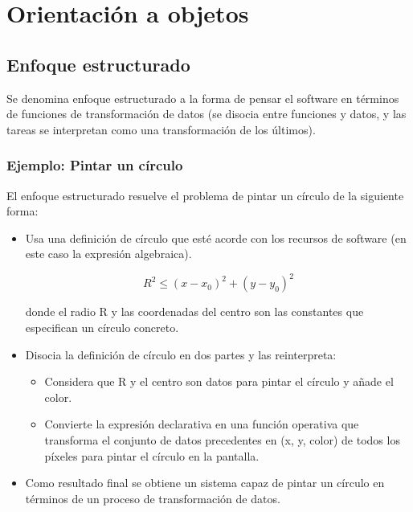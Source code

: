 
\section{Orientación a objetos}
\label{sec:org3620eb4}
\subsection{Enfoque estructurado}
\label{sec:orgc590b61} Se denomina enfoque estructurado a la forma de
pensar el software en términos de funciones de transformación de datos
(se disocia entre funciones y datos, y las tareas se interpretan como
una transformación de los últimos).

\subsubsection{Ejemplo: Pintar un círculo}
\label{sec:orge1ddd3a} El enfoque estructurado resuelve el problema de
pintar un círculo de la siguiente forma:
\begin{itemize}
\item Usa una definición de círculo que esté acorde con los recursos
  de software (en este caso la expresión algebraica).

  \begin{equation} R^{2} \le (x - x_{0})^{2} + (y - y_{0})^{2}
  \end{equation}

  donde el radio R y las coordenadas del centro son las constantes que
  especifican un círculo concreto.
\item Disocia la definición de círculo en dos partes y las
  reinterpreta:
  \begin{itemize}
  \item Considera que R y el centro son datos para pintar el círculo y
    añade el color.
  \item Convierte la expresión declarativa en una función operativa
    que transforma el conjunto de datos precedentes en (x, y, color) de
    todos los píxeles para pintar el círculo en la pantalla.
  \end{itemize}
\item Como resultado final se obtiene un sistema capaz de pintar un
  círculo en términos de un proceso de transformación de datos.
\end{itemize}

